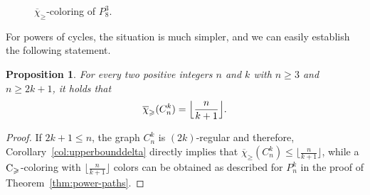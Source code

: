 \documentclass{article}
\newtheorem{proposition}[theorem]{Proposition}
\theoremstyle{definition}
\newcommand{\mc}{\overline{\chi}_{\geqslant}}
\newcommand{\cg}{{\rm C}_{\geqslant}}
\begin{document}
\begin{figure}[htb]
\centering
{}
\caption{$\mc$-coloring of $P_8^3$.}
\label{fig:P8-cube-arcs}
\end{figure}

For powers of cycles, the situation is much simpler, and we can easily establish the following statement.
\begin{proposition} \label{prop:cycle-k}
    For every two positive integers $n$ and $k$ with $n\geq 3$ and $n\geq 2k+1$, it holds that 
    \begin{align*} 
    \mc(C_n^k)=\Bigl\lfloor\frac{n}{k+1}\Bigr\rfloor.
\end{align*}
\end{proposition}
\begin{proof} 
If $2k+1 \le n$, the graph $C_n^k$ is $(2k)$-regular and therefore, Corollary~\ref{col:upperbounddelta} directly implies that $\mc(C_n^k)\leq \lfloor\frac{n}{k+1}\rfloor$, while a $\cg$-coloring with $\lfloor\frac{n}{k+1}\rfloor$ colors can be obtained as described for $P_n^k$ in the proof of Theorem~\ref{thm:power-paths}.
\end{proof}

\end{document}
